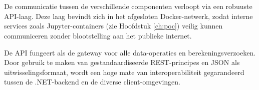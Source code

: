 \section{}
\label{ch:architecture-api}

De communicatie tussen de verschillende componenten verloopt via een robuuste API-laag. Deze laag bevindt zich in het afgesloten Docker-netwerk, zodat interne services zoals Jupyter-containers (zie Hoofdstuk \ref{ch:poc}) veilig kunnen communiceren zonder blootstelling aan het publieke internet.

De API fungeert als de gateway voor alle data-operaties en berekeningsverzoeken. Door gebruik te maken van gestandaardiseerde REST-principes en JSON als uitwisselingsformaat, wordt een hoge mate van interoperabiliteit gegarandeerd tussen de .NET-backend en de diverse client-omgevingen.
